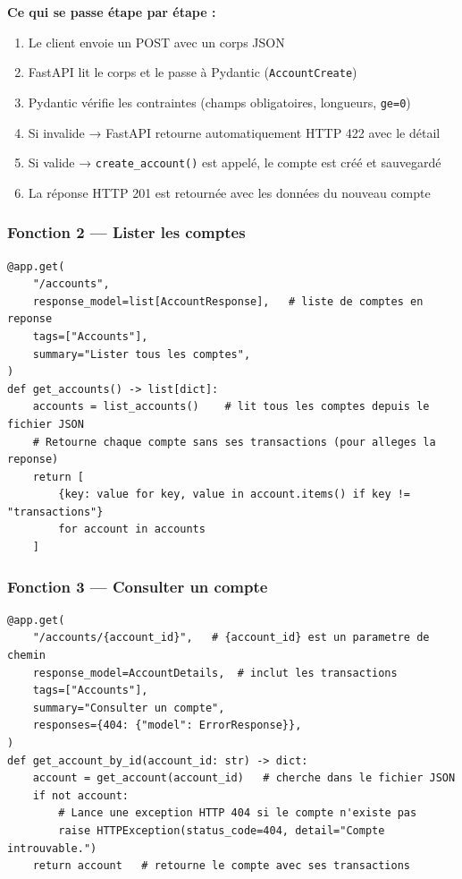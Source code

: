 \documentclass[12pt,a4paper]{article}
\begin{document}
\textbf{Ce qui se passe étape par étape :}
\begin{enumerate}[noitemsep]
  \item Le client envoie un POST avec un corps JSON
  \item FastAPI lit le corps et le passe à Pydantic (\texttt{AccountCreate})
  \item Pydantic vérifie les contraintes (champs obligatoires, longueurs, \texttt{ge=0})
  \item Si invalide → FastAPI retourne automatiquement HTTP 422 avec le détail
  \item Si valide → \texttt{create\_account()} est appelé, le compte est créé et sauvegardé
  \item La réponse HTTP 201 est retournée avec les données du nouveau compte
\end{enumerate}

\subsubsection{Fonction 2 — Lister les comptes}

\begin{lstlisting}[style=python, caption={main.py — GET /accounts}]
@app.get(
    "/accounts",
    response_model=list[AccountResponse],   # liste de comptes en reponse
    tags=["Accounts"],
    summary="Lister tous les comptes",
)
def get_accounts() -> list[dict]:
    accounts = list_accounts()    # lit tous les comptes depuis le fichier JSON
    # Retourne chaque compte sans ses transactions (pour alleges la reponse)
    return [
        {key: value for key, value in account.items() if key != "transactions"}
        for account in accounts
    ]
\end{lstlisting}

\subsubsection{Fonction 3 — Consulter un compte}

\begin{lstlisting}[style=python, caption={main.py — GET /accounts/\{account\_id\}}]
@app.get(
    "/accounts/{account_id}",   # {account_id} est un parametre de chemin
    response_model=AccountDetails,  # inclut les transactions
    tags=["Accounts"],
    summary="Consulter un compte",
    responses={404: {"model": ErrorResponse}},
)
def get_account_by_id(account_id: str) -> dict:
    account = get_account(account_id)   # cherche dans le fichier JSON
    if not account:
        # Lance une exception HTTP 404 si le compte n'existe pas
        raise HTTPException(status_code=404, detail="Compte introuvable.")
    return account   # retourne le compte avec ses transactions
\end{lstlisting}
\end{document}
